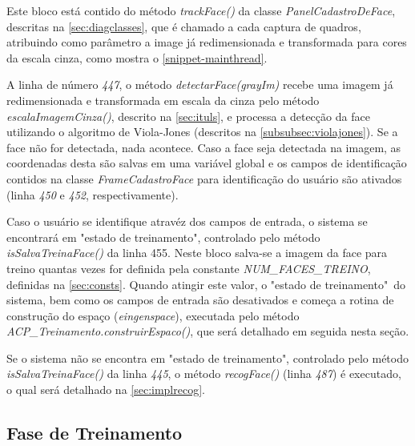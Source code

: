 \codigoJava



Este bloco está contido do método \textit{trackFace()} da classe \textit{PanelCadastroDeFace}, descritas na \autoref{sec:diagclasses}, que é chamado a cada captura de quadros, atribuindo como parâmetro a image já redimensionada e transformada para cores da escala cinza, como mostra o  \autoref{snippet-mainthread}.

A linha de número \textit{447}, o método \textit{detectarFace(grayIm)} recebe uma imagem já redimensionada e transformada em escala da cinza pelo método \textit{escalaImagemCinza()}, descrito na \autoref{sec:ituls}, e processa a detecção da face utilizando o algoritmo de Viola-Jones (descritos na \autoref{subsubsec:violajones}). Se a face não for detectada, nada acontece. Caso a face seja detectada na imagem, as coordenadas desta são salvas em uma variável global e os campos de identificação contidos na classe \textit{FrameCadastroFace} para identificação do usuário são ativados  (linha \textit{450} e \textit{452}, respectivamente). 

Caso o usuário se identifique atravéz dos campos de entrada, o sistema se encontrará em "estado de treinamento", controlado pelo método \textit{isSalvaTreinaFace()} da linha 455. Neste bloco salva-se a imagem da face para treino quantas vezes for definida pela constante \textit{NUM\_FACES\_TREINO}, definidas na \autoref{sec:consts}. Quando atingir este valor, o "estado de treinamento"\ do sistema, bem como os campos de entrada são desativados e começa a rotina de construção do espaço (\textit{eingenspace}), executada pelo método \textit{ACP\_Treinamento.construirEspaco()}, que será detalhado em seguida nesta seção.

Se o sistema não se encontra em "estado de treinamento", controlado pelo método \textit{isSalvaTreinaFace()} da linha \textit{445}, o método \textit{recogFace()} (linha \textit{487}) é executado, o qual será detalhado na \autoref{sec:implrecog}.


\subsection{Fase de Treinamento}\label{sec:impltrein}



